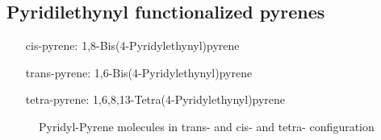 \subsection{Pyridilethynyl functionalized pyrenes}
\begin{itemize}
	\item[cis-pyrene:] 1,8-Bis(4-Pyridylethynyl)pyrene
	\item[trans-pyrene:] 1,6-Bis(4-Pyridylethynyl)pyrene
	\item[tetra-pyrene:] 1,6,8,13-Tetra(4-Pyridylethynyl)pyrene
\end{itemize}

\begin{figure}[]
	\begin{center}
	\end{center}
	\caption{Pyridyl-Pyrene molecules in trans-  and cis-  and tetra-  configuration}
	\label{fig:pyrene}
\end{figure}

